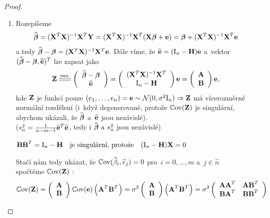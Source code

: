 \begin{proof}
\begin{enumerate}
  \item Rozepíšeme
  $$ \widehat{\boldsymbol{\beta}} = (\mathbf{X}^T \mathbf{X})^{-1} \mathbf{X}^T \mathbf{Y} = (\mathbf{X}^T \mathbf{X})^{-1} \mathbf{X}^T (\mathbf{X} \boldsymbol{\beta} + \mathbf{e}) = \boldsymbol{\beta} + (\mathbf{X}^T \mathbf{X})^{-1} \mathbf{X}^T \mathbf{e}$$
a tedy $\widehat{\boldsymbol{\beta}} - \boldsymbol{\beta} = (\mathbf{X}^T \mathbf{X})^{-1} \mathbf{X}^T \mathbf{e}$. Dále víme, že $\widehat{\mathbf{e}} = (\text{I}_n - \textbf{H}) \mathbf{e}$ a~vektor $(\widehat{\boldsymbol{\beta}} - \boldsymbol{\beta}, \widehat{\mathbf{e}})^T$ lze zapsat jako
 $$
\Zb \equal{\text{ozn.}} \left(\begin{array}{c}
 \wbetab - \betab \\
 \heb
\end{array}
 \right)
 = 
 \left(\begin{array}{c}
 (\X^T \X)^{-1} \X^T \\
 \text{I}_n - \Hm
 \end{array}
 \right) \eb
 = 
 \left(\begin{array}{c}
 \Am  \\
 \Bm
 \end{array}
 \right) \eb,
 $$
kde $\mathbf{Z}$ je funkcí pouze $(e_1,\dots, e_n) = \mathbf{e} \sim \mathcal{N} (0, \sigma^2 \text{I}_n) \Rightarrow \mathbf{Z}$ má vícerozměrné normální rozdělení (i~když degenerované, protože $\mathbb{C}\mathrm{ov}(\mathbf{Z})$ je singulární, abychom ukázali, že $\widehat{\boldsymbol{\beta}}$ a~$\widehat{\mathbf{e}}$ jsou  nezávislé). \\
 ($s_n^2 = \frac{1}{n - m - 1} \widehat{\mathbf{e}}^T \widehat{\mathbf{e}}$, tedy i $\widehat{\boldsymbol{\beta}} \text{ a~} s_n^2$ jsou nezávislé)
\begin{remark}
 $\textbf{B} \textbf{B}^T = \text{I}_n - \textbf{H} \quad \text{je singulární, protože} \quad (\text{I}_n - \textbf{H}) \mathbf{X} = 0$
\end{remark}
Stačí nám tedy ukázat, že $\mathbb{C}\mathrm{ov}(\widehat{\beta}_i, \widehat{e}_j) = 0$ pro~$i = 0,\dots, m$ a~$j  \in\widehat{n} $ \\
spočtěme $\mathbb{C}\mathrm{ov}(\mathbf{Z})$ : \\
 $$
  \mathbb{C}\mathrm{ov}(\mathbf{Z})
 = 
  \left(\begin{array}{c}
 \textbf{A}  \\
 \textbf{B}
 \end{array}
 \right) \mathbb{C}\mathrm{ov}(\mathbf{e}) \left(\textbf{A}^T \textbf{B}^T  \right)
 = 
 \sigma^2
 \left(\begin{array}{c}
 \textbf{A}  \\
 \textbf{B}
 \end{array} \right)
 \left(\textbf{A}^T \textbf{B}^T  \right)
 = 
 \sigma^2
 \left(\begin{array}{cc}
 \textbf{A} \textbf{A}^T & \textbf{A} \textbf{B}^T \\
 \textbf{B} \textbf{A}^T & \textbf{B} \textbf{B}^T
 \end{array} \right)
 $$


\end{enumerate}
\end{proof}
